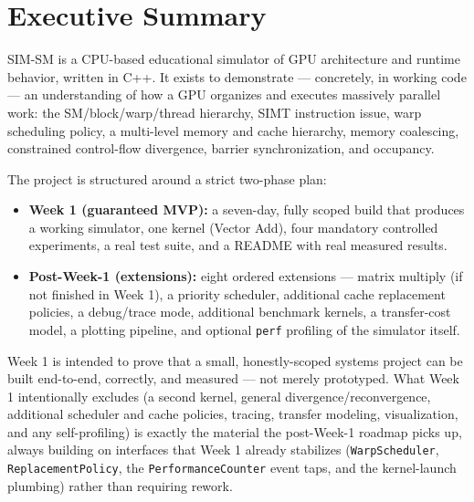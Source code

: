 \documentclass[11pt]{article}
\begin{document}
\tableofcontents
\newpage

\section{Executive Summary}

SIM-SM is a CPU-based educational simulator of GPU architecture and
runtime behavior, written in C++. It exists to demonstrate --- concretely,
in working code --- an understanding of how a GPU organizes and executes
massively parallel work: the SM/block/warp/thread hierarchy, SIMT
instruction issue, warp scheduling policy, a multi-level memory and cache
hierarchy, memory coalescing, constrained control-flow divergence, barrier
synchronization, and occupancy.

The project is structured around a strict two-phase plan:

\begin{itemize}[leftmargin=1.2cm]
  \item \textbf{Week 1 (guaranteed MVP):} a seven-day, fully scoped build
  that produces a working simulator, one kernel (Vector Add), four
  mandatory controlled experiments, a real test suite, and a README with
  real measured results.
  \item \textbf{Post-Week-1 (extensions):} eight ordered extensions ---
  matrix multiply (if not finished in Week 1), a priority scheduler,
  additional cache replacement policies, a debug/trace mode, additional
  benchmark kernels, a transfer-cost model, a plotting pipeline, and
  optional \texttt{perf} profiling of the simulator itself.
\end{itemize}

Week 1 is intended to prove that a small, honestly-scoped systems project
can be built end-to-end, correctly, and measured --- not merely
prototyped. What Week 1 intentionally excludes (a second kernel, general
divergence/reconvergence, additional scheduler and cache policies, tracing,
transfer modeling, visualization, and any self-profiling) is exactly the
material the post-Week-1 roadmap picks up, always building on interfaces
that Week 1 already stabilizes (\texttt{WarpScheduler},
\texttt{ReplacementPolicy}, the \texttt{PerformanceCounter} event taps, and
the kernel-launch plumbing) rather than requiring rework.

\begin{center}
\end{center}
\end{document}
